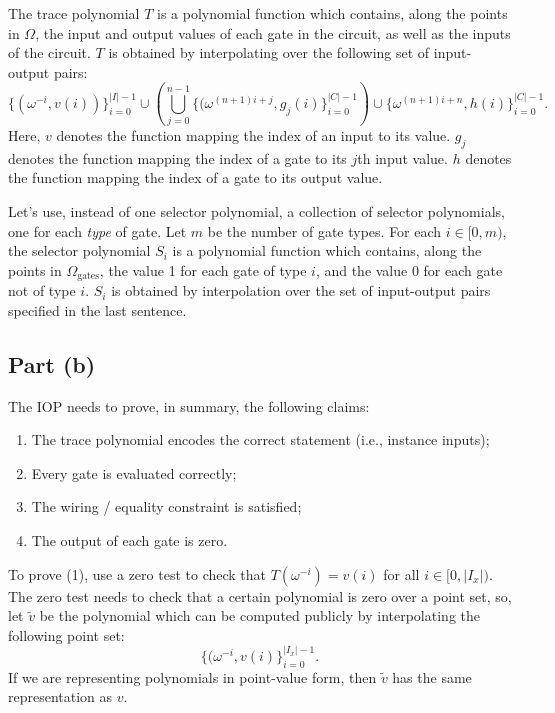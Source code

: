 \documentclass[11pt]{article}
\begin{document}
The trace polynomial $T$ is a polynomial function which contains, along the points in $\Omega$, the input and
output values of each gate in the circuit, as well as the inputs of the circuit. $T$ is obtained by
interpolating over the following set of input-output pairs:
\begin{equation}
	\{(\omega^{-i}, v(i))\}_{i=0}^{|I|-1} \cup \left( \bigcup_{j=0}^{n-1} \{(\omega^{(n+1)i+j}, g_j(i)\}_{i=0}^{|C|-1} \right )
	\cup \{\omega^{(n+1)i+n}, h(i)\}_{i=0}^{|C|-1}.
\end{equation}
Here, $v$ denotes the function mapping the index of an input to its value. $g_j$ denotes the function mapping the
index of a gate to its $j$th input value. $h$ denotes the function mapping the index of a gate to its output value.

Let's use, instead of one selector polynomial, a collection of selector polynomials, one for each \emph{type}\/
of gate. Let $m$ be the number of gate types. For each $i \in [0,m)$, the selector polynomial $S_i$ is a
polynomial function which contains, along the points in $\Omega_{\text{gates}}$, the value 1 for each gate
of type $i$, and the value 0 for each gate not of type $i$. $S_i$ is obtained by interpolation over the
set of input-output pairs specified in the last sentence.

\subsection{Part (b)}

The IOP needs to prove, in summary, the following claims:

\begin{enumerate}
	\item The trace polynomial encodes the correct statement (i.e., instance inputs);
	\item Every gate is evaluated correctly;
	\item The wiring / equality constraint is satisfied;
	\item The output of each gate is zero.
\end{enumerate}

To prove (1), use a zero test to check that $T(\omega^{-i}) = v(i)$ for all $i \in [0,|I_x|)$.
The zero test needs to check that a certain polynomial is zero over a point set, so,
let $\widetilde{v}$ be the polynomial which can be computed publicly by interpolating the
following point set:
\begin{equation}
	\{(\omega^{-i}, v(i)\}_{i=0}^{|I_x|-1}.
\end{equation}
If we are representing polynomials in point-value form, then $\widetilde{v}$ has the same
representation as $v$.
\end{document}
